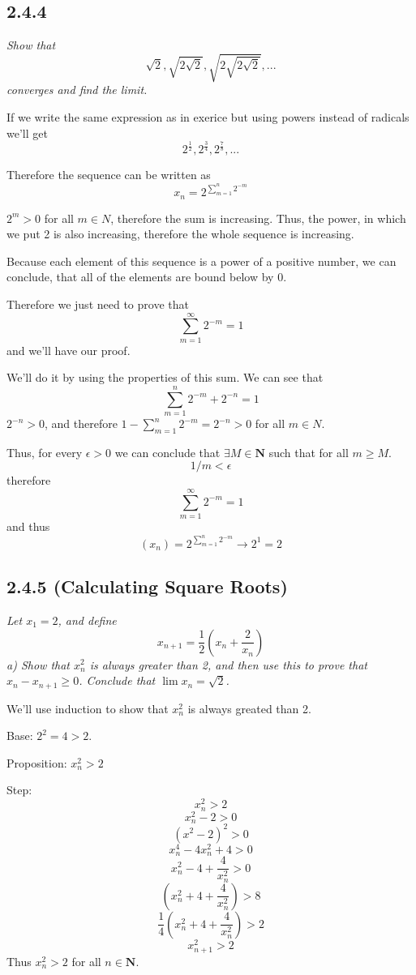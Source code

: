 \documentclass[11pt,oneside,titlepage]{book}
\begin{document}
\subsection*{2.4.4}
\textit{Show that }
$$ \sqrt{2}, \sqrt{2 \sqrt{2}}, \sqrt{ 2 \sqrt{ 2 \sqrt{2}}}, ... $$
\textit{converges and find the limit.}

If we write the same expression as in exerice but using powers instead of
radicals we'll get
$$ 2^{\frac{1}{2}}, 2^{\frac{3}{4}}, 2^{\frac{7}{8}}, ...$$ 

Therefore the sequence can be written as
$$x_n =  2 ^{\sum_{m = 1}^n 2^{-m}}$$

$2^m > 0$ for all $m \in N$, therefore the sum is increasing. Thus, the power, in
which we put 2 is also increasing, therefore the whole sequence is increasing.

Because each element of this sequence is a power of a positive number, we can
conclude, that all of the elements are bound below by 0.

Therefore we just need to prove that 
$$\sum_{m = 1}^{\infty} 2^{-m} = 1$$
and we'll have our proof.

We'll do it by using the properties of this sum. We can see that
$$\sum_{m = 1}^{n}2^{-m} + 2^{-n} = 1$$
$2^{-n} > 0$, and therefore $1 - \sum_{m = 1}^{n}2^{-m} = 2^{-n} > 0$ for
all $m \in N$.

Thus, for every $\epsilon > 0$ we can conclude that $\exists M \in \textbf{N}$ such
that for all $m \geq M$.
$$1/m < \epsilon$$
therefore
$$\sum_{m = 1}^{\infty} 2^{-m} = 1$$
and thus
$$(x_n) =  2 ^{\sum_{m = 1}^n 2^{-m}} \to 2^1 = 2$$

\subsection*{2.4.5 (Calculating Square Roots)}
\textit{Let $x_1 = 2$, and define }
$$x_{n+1} = \frac{1}{2}(x_n + \frac{2}{x_n})$$
\textit{a) Show that $x_n^2$ is always greater than 2, and then use this to prove
  that $x_n - x_{n + 1} \geq 0$. Conclude that $\lim x_n = \sqrt{2}$.  }

We'll use induction to show that $x_n^2$ is always greated than 2.

Base: $2 ^2 = 4 > 2$.

Proposition: $x_n ^ 2 > 2$

Step:
$$x_n^2 > 2$$
$$x_n^2 - 2 > 0$$
$$(x^2 - 2)^2 > 0$$
$$x_n ^ 4 - 4 x_n^2 + 4 > 0$$
$$x_n ^ 2 - 4 + \frac{4}{x_n^2} > 0$$
$$(x_n ^ 2 + 4 + \frac{4}{x_n^2}) > 8$$
$$\frac{1}{4}(x_n ^ 2 + 4 + \frac{4}{x_n^2}) > 2$$
$$x_{n + 1}^2 > 2$$
Thus $x_n^2 > 2$ for all $n \in \textbf{N}$.
\end{document}
